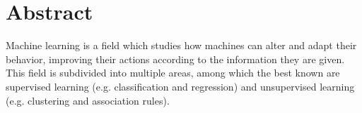 









  \section*{Abstract}
Machine learning is a field which studies how machines can alter and adapt their behavior, improving their actions according to the information they are given. This field is subdivided into multiple areas, among which the best known are supervised learning (e.g. classification and regression) and unsupervised learning (e.g. clustering and association rules).

